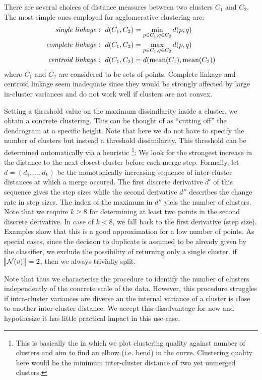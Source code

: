 \documentclass[
	fontsize=10pt, %
	twoside=false, %
	secnumdepth=1, %
]{kaobook}
\begin{document}
There are several choices of distance measures between two clusters $C_1$ and
$C_2$. The most simple ones employed for agglomerative clustering are:
\begin{align*}
  \text{{\textit{{single linkage}}}}: &~~ d(C_1, C_2) = \min_{p \in C_1, q \in C_2} d(p,q) \\
  \text{{\textit{{complete linkage}}}}: &~~ d(C_1, C_2) = \max_{p \in C_1, q \in C_2} d(p,q) \\
  \text{{\textit{{centroid linkage}}}}: &~~ d(C_1, C_2) = d(\text{mean}(C_1),\text{mean}(C_2))
\end{align*}
where $C_1$ and $C_2$ are considered to be sets of points. Complete linkage and
centroid linkage seem inadequate since they would be strongly affected by large
in-cluster variances and do not work well if clusters are not convex.

Setting a threshold value on the maximum dissimilarity inside a cluster, we
obtain a concrete clustering. This can be thought of as ``cutting off'' the
dendrogram at a specific height. Note that here we do not have to specify the
number of clusters but instead a threshold dissimilarity. This threshold can be
determined automatically via a heuristic
\footnote{
  This is basically the  in which we plot clustering quality
  against number of clusters and aim to find an elbow (i.e. bend) in the curve.
  Clustering quality here would be the minimum inter-cluster distance of two yet
  unmerged clusters. }: We look for the strongest increase in the distance to
the next closest cluster before each merge step. Formally, let $d = (d_1, ..., d_k)$
be the monotonically increasing sequence of inter-cluster distances at which a
merge occured. The first discrete derivative $d'$ of this sequence gives the step
sizes while the second derivative $d''$ describes the change rate in step sizes. The
index of the maximum in $d''$ yiels the number of clusters.
Note that we require $k \geq 8$ for determining at least two points in the second
discrete derivative. In case of $k < 8$, we fall back to the first derivative
(step size). Examples show that this is a good approximation for a low number of points.
%
As special cases, since the decision to duplicate is assumed to be already given
by the classifier, we exclude the possibility of returning only a single
cluster. if $\norm{\mathcal{N}(v)}=2$, then we always trivially split. 

Note that thus we characterise the procedure to identify the number of clusters
independently of the concrete scale of the data. However, this procedure
struggles if intra-cluster variances are diverse an the internal variance of a
cluster is close to another inter-cluster distance. We accept this disadvantage
for now and hypothesize it has little practical impact in this use-case.
\end{document}
